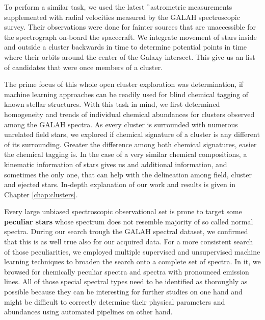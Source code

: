 To perform a similar task, we used the latest \G\ astrometric measurements supplemented with radial velocities measured by the GALAH spectroscopic survey. Their observations were done for fainter sources that are unaccessible for the spectrograph on-board the spacecraft. We integrate movement of stars inside and outside a cluster backwards in time to determine potential points in time where their orbits around the center of the Galaxy intersect. This give us an list of candidates that were once members of a cluster. %

The prime focus of this whole open cluster exploration was determination, if machine learning approaches can be readily used for blind chemical tagging of known stellar structures. With this task in mind, we first determined homogeneity and trends of individual chemical abundances for clusters observed among the GALAH spectra. As every cluster is surrounded with numerous unrelated field stars, we explored if chemical signature of a cluster is any different of its surrounding. Greater the difference among both chemical signatures, easier the chemical tagging is. In the case of a very similar chemical compositions, a kinematic information of stars gives us and additional information, and sometimes the only one, that can help with the delineation among field, cluster and ejected stars. In-depth explanation of our work and results is given in Chapter \ref{chap:clusters}.

Every large unbiased spectroscopic observational set is prone to target some \textbf{peculiar stars} whose spectrum does not resemble majority of so called normal spectra. During our search trough the GALAH spectral dataset, we confirmed that this is as well true also for our acquired data. For a more consistent search of those peculiarities, we employed multiple supervised and unsupervised machine learning techniques to broaden the search onto a complete set of spectra. In it, we browsed for chemically peculiar spectra and spectra with pronounced emission lines. All of those special spectral types need to be identified as thoroughly as possible because they can be interesting for further studies on one hand and might be difficult to correctly determine their physical parameters and abundances using automated pipelines on other hand.

